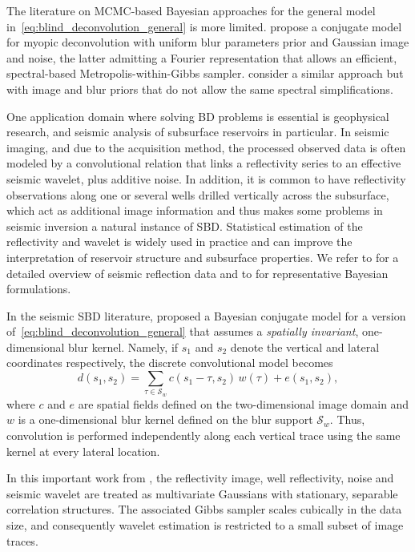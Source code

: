 \documentclass[12pt]{article}
\begin{document}
The literature on MCMC-based Bayesian approaches for the general model in~\eqref{eq:blind_deconvolution_general} is more limited. \citet{orieux2010bayesian} propose a conjugate model for myopic deconvolution with uniform blur parameters prior and Gaussian image and noise, the latter admitting a Fourier representation that allows an efficient, spectral-based Metropolis-within-Gibbs sampler. \citet{Park2012} consider a similar approach but with image and blur priors that do not allow the same spectral simplifications. 

One application domain where solving BD problems is essential is geophysical research, and seismic analysis of subsurface reservoirs in particular. In seismic imaging, and due to the acquisition method, the processed observed data is often modeled by a convolutional relation that links a reflectivity series to an effective seismic wavelet, plus additive noise. In addition, it is common to have reflectivity observations along one or several wells drilled vertically across the subsurface, which act as additional image information and thus makes some problems in seismic inversion a natural instance of SBD. Statistical estimation of the reflectivity and wavelet is widely used in practice and can improve the interpretation of reservoir structure and subsurface properties. We refer to \citet{SheriffGeldart1995} for a detailed overview of seismic reflection data and to \citet{KaaresenTofinn1993,GranaEtAl2022} for representative Bayesian formulations.

In the seismic SBD literature, \citet{BulandOmre2003a, BulandOmre2003b} proposed a Bayesian conjugate model for a version of~\eqref{eq:blind_deconvolution_general} that assumes a \textit{spatially invariant}, one-dimensional blur kernel.
Namely, if $s_1$ and $s_2$ denote the vertical and lateral coordinates respectively, the discrete convolutional model becomes
\begin{equation}
    d(s_1,s_2)
    =
    \sum_{\tau \in \mathcal{S}_w}
    c(s_1-\tau,s_2)\,w(\tau)
    +
    e(s_1,s_2),
    \label{eq:blind_deconvolution}
\end{equation}
where $c$ and $e$ are spatial fields defined on the two-dimensional image domain and $w$ is a one-dimensional blur kernel defined on the blur support $\mathcal{S}_w$. Thus, convolution is performed independently along each vertical trace using the same kernel at every lateral location. 

In this important work from \citet{BulandOmre2003a, BulandOmre2003b}, the reflectivity image, well reflectivity, noise and seismic wavelet are treated as multivariate Gaussians with stationary, separable correlation structures. The associated Gibbs sampler scales cubically in the data size, and consequently wavelet estimation is restricted to a small subset of image traces. 
\end{document}
